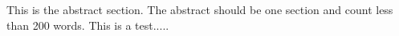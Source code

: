 This is the abstract section. The abstract should be one section and count less than 200 words. This is a test.....